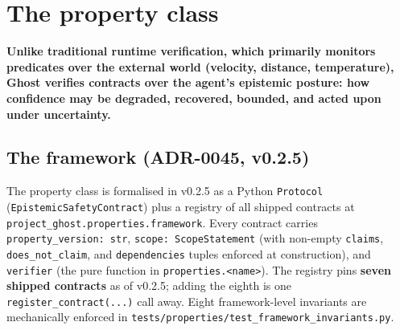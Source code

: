 \documentclass[acmsmall,nonacm=true,review=false]{acmart}
\theoremstyle{plain}
\begin{document}
\section{The property class}
\label{sec:properties}

\textbf{Unlike traditional runtime verification, which primarily
monitors predicates over the external world (velocity, distance,
temperature), Ghost verifies contracts over the agent's epistemic
posture: how confidence may be degraded, recovered, bounded, and
acted upon under uncertainty.}

\subsection{The framework (ADR-0045, v0.2.5)}
\label{sec:framework}

The property class is formalised in v0.2.5 as a Python
\texttt{Protocol} (\texttt{EpistemicSafetyContract}) plus a
registry of all shipped contracts at
\texttt{project\_ghost.properties.framework}. Every contract
carries \texttt{property\_version: str},
\texttt{scope: ScopeStatement} (with non-empty \texttt{claims},
\texttt{does\_not\_claim}, and \texttt{dependencies} tuples
enforced at construction), and \texttt{verifier} (the pure
function in \texttt{properties.<name>}). The registry pins
\textbf{seven shipped contracts} as of v0.2.5; adding the eighth
is one \texttt{register\_contract(...)} call away. Eight
framework-level invariants are mechanically enforced in
\texttt{tests/properties/test\_framework\_invariants.py}.
\end{document}
